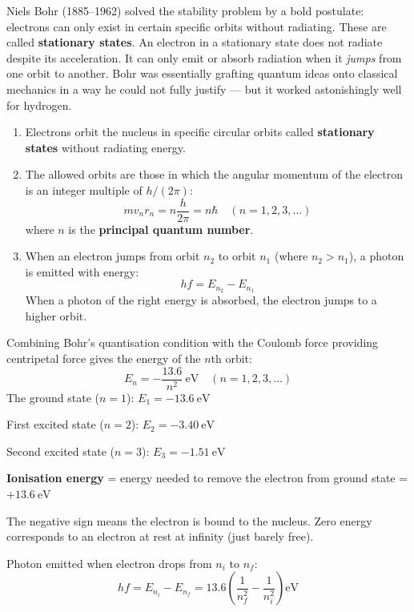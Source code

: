\begin{historybox}
Niels Bohr (1885--1962) solved the stability problem
by a bold postulate: electrons can only exist in
certain specific orbits without radiating. These are
called \textbf{stationary states}. An electron in a
stationary state does not radiate despite its
acceleration. It can only emit or absorb radiation
when it \textit{jumps} from one orbit to another.
Bohr was essentially grafting quantum ideas onto
classical mechanics in a way he could not fully justify
--- but it worked astonishingly well for hydrogen.
\end{historybox}

\begin{lawbox}
\begin{enumerate}[noitemsep]
  \item Electrons orbit the nucleus in specific
  circular orbits called \textbf{stationary states}
  without radiating energy.
  \item The allowed orbits are those in which the
  angular momentum of the electron is an integer
  multiple of $h/(2\pi)$:
  \[
    mv_nr_n = n\frac{h}{2\pi} = n\hbar
    \quad (n = 1, 2, 3, \ldots)
  \]
  where $n$ is the \textbf{principal quantum number}.
  \item When an electron jumps from orbit $n_2$ to
  orbit $n_1$ (where $n_2 > n_1$), a photon is
  emitted with energy:
  \[
    hf = E_{n_2} - E_{n_1}
  \]
  When a photon of the right energy is absorbed, the
  electron jumps to a higher orbit.
\end{enumerate}
\end{lawbox}

\begin{processbox}
Combining Bohr's quantisation condition with the
Coulomb force providing centripetal force gives the
energy of the $n$th orbit:
\[
  E_n = -\frac{13.6}{n^2}\ \text{eV}
  \quad (n = 1, 2, 3, \ldots)
\]
The ground state ($n=1$): $E_1 = -13.6\ \text{eV}$

First excited state ($n=2$): $E_2 = -3.40\ \text{eV}$

Second excited state ($n=3$): $E_3 = -1.51\ \text{eV}$

\textbf{Ionisation energy} = energy needed to remove
the electron from ground state = $+13.6\ \text{eV}$

The negative sign means the electron is bound to the
nucleus. Zero energy corresponds to an electron at
rest at infinity (just barely free).

Photon emitted when electron drops from $n_i$ to $n_f$:
\[
  hf = E_{n_i} - E_{n_f}
  = 13.6\left(\frac{1}{n_f^2} - \frac{1}{n_i^2}\right)
  \text{eV}
\]
\end{processbox}

